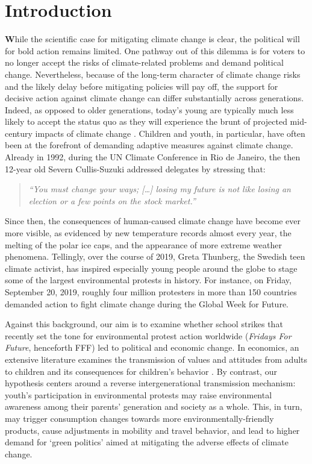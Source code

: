 

\section{Introduction}\label{sec_greta_cons:intro}
\lettrine[lines=2,nindent=0pt]{\color{darkgray}\textbf{W}}{}hile the scientific case for mitigating climate change is clear, the political will for bold action remains limited. One pathway out of this dilemma is for voters to no longer accept the risks of climate-related problems and demand political change. Nevertheless, because of the long-term character of climate change risks and the likely delay before mitigating policies will pay off, the support for decisive action against climate change can differ substantially across generations. Indeed, as opposed to older generations, today's young are typically much less likely to accept the status quo as they will experience the brunt of projected mid-century impacts of climate change \citep{hersch2006generational}. Children and youth, in particular, have often been at the forefront of demanding adaptive measures against climate change. Already in 1992, during the UN Climate Conference in Rio de Janeiro, the then 12-year old Severn Cullis-Suzuki addressed delegates by stressing that: 
\begin{quote}
	\textit{``You must change your ways; […] losing my future is not like losing an election or a few points on the stock market.''}
\end{quote}
Since then, the consequences of human-caused climate change have become ever more visible, as evidenced by new temperature records almost every year, the melting of the polar ice caps, and the appearance of more extreme weather phenomena. Tellingly, over the course of 2019, Greta Thunberg, the Swedish teen climate activist, has inspired especially young people around the globe to stage some of the largest environmental protests in history. For instance, on Friday, September 20, 2019, roughly four million protesters in more than 150 countries demanded action to fight climate change during the Global Week for Future. 


Against this background, our aim is to examine whether school strikes that recently set the tone for environmental protest action worldwide (\textit{Fridays For Future}, henceforth FFF) led to political and economic change. In economics, an extensive literature examines the transmission of values and attitudes from adults to children and its consequences for children's behavior \citep{bisin2001economics,figlio2019longterm}. By contrast, our hypothesis centers around a reverse intergenerational transmission mechanism: youth's participation in environmental protests may raise environmental awareness among their parents' generation and society as a whole. This, in turn, may trigger consumption changes towards more environmentally-friendly products, cause adjustments in mobility and travel behavior, and lead to higher demand for `green politics' aimed at mitigating the adverse effects of climate change. 

